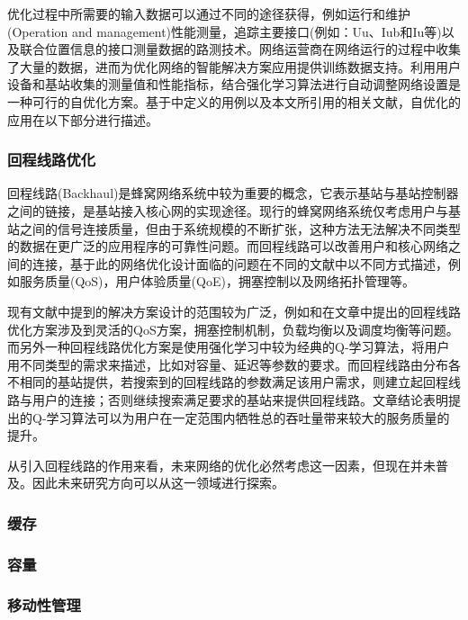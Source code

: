 \documentclass{IEEEtran}
\begin{document}
优化过程中所需要的输入数据可以通过不同的途径获得，例如运行和维护(Operation and management)性能测量，追踪主要接口(例如：Uu、Iub和Iu等)以及联合位置信息的接口测量数据的路测技术。网络运营商在网络运行的过程中收集了大量的数据，进而为优化网络的智能解决方案应用提供训练数据支持。利用用户设备和基站收集的测量值和性能指标，结合强化学习算法进行自动调整网络设置是一种可行的自优化方案。基于\cite{3gpp.36.902}中定义的用例以及本文所引用的相关文献，自优化的应用在以下部分进行描述。

\subsubsection{回程线路优化}

回程线路(Backhaul)是蜂窝网络系统中较为重要的概念，它表示基站与基站控制器之间的链接，是基站接入核心网的实现途径。现行的蜂窝网络系统仅考虑用户与基站之间的信号连接质量，但由于系统规模的不断扩张，这种方法无法解决不同类型的数据在更广泛的应用程序的可靠性问题。而回程线路可以改善用户和核心网络之间的连接，基于此的网络优化设计面临的问题在不同的文献中以不同方式描述，例如服务质量(QoS)，用户体验质量(QoE)，拥塞控制以及网络拓扑管理等。

现有文献中提到的解决方案设计的范围较为广泛，例如\cite{Wainio2016}和\cite{Chen2015}在文章中提出的回程线路优化方案涉及到灵活的QoS方案，拥塞控制机制，负载均衡以及调度均衡等问题。而另外一种回程线路优化方案是使用强化学习中较为经典的Q-学习算法，\cite{Jaber2015}\cite{Jaber2016a}\cite{Jaber2016c}将用户用不同类型的需求来描述，比如对容量、延迟等参数的要求。而回程线路由分布各不相同的基站提供，若搜索到的回程线路的参数满足该用户需求，则建立起回程线路与用户的连接；否则继续搜索满足要求的基站来提供回程线路。文章结论表明提出的Q-学习算法可以为用户在一定范围内牺牲总的吞吐量带来较大的服务质量的提升。

从引入回程线路的作用来看，未来网络的优化必然考虑这一因素，但现在并未普及。因此未来研究方向可以从这一领域进行探索。

\subsubsection{缓存}




\subsubsection{容量}
\subsubsection{移动性管理}
\end{document}
